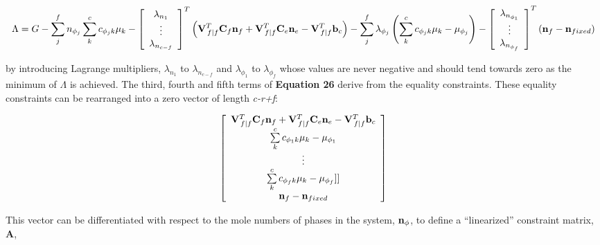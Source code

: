 \documentclass[11pt, titlepage, twoside]{article}
\begin{document}
\begin{MPEquation}[!ht]
\begin{equation}
\Lambda  = G - \sum\limits_j^f {{n_{{\phi _j}}}\sum\limits_k^c {{c_{{\phi _j}k}}{\mu _k}} }  - {\left[ {\begin{array}{*{20}{c}}
{{\lambda _{{n_1}}}}\\
 \vdots \\
{{\lambda _{{n_{c - f}}}}}
\end{array}} \right]^T}\left( {{\bf{V}}_{\left. f \right|f}^T{{\bf{C}}_f}{{\bf{n}}_f} + {\bf{V}}_{\left. f \right|f}^T{{\bf{C}}_e}{{\bf{n}}_e} - {\bf{V}}_{\left. f \right|f}^T{{\bf{b}}_c}} \right) - \sum\limits_j^f {{\lambda _{{\phi _j}}}\left( {\sum\limits_k^c {{c_{{\phi _j}k}}{\mu _k}}  - {\mu _{{\phi _j}}}} \right)} - {\left[ {\begin{array}{*{20}{c}}
{{\lambda _{{n_{{\phi _1}}}}}}\\
 \vdots \\
{{\lambda _{{n_{{\phi _f}}}}}}
\end{array}} \right]^T}\left( {{{\bf{n}}_f} - {{\bf{n}}_{fixed}}} \right)
\end{equation}
\label{MPEquationElement:CC4A876E-C613-4F91-D9DA-BC1B1C7EFC94}
\end{MPEquation}
by introducing Lagrange multipliers, ${{\lambda _{{n_1}}}}$ to ${{\lambda _{{n_{c - f}}}}}$ and ${{\lambda _{{\phi _1}}}}$ to ${{\lambda _{{\phi _f}}}}$ whose values are never negative and should tend towards zero as the minimum of $\Lambda$ is achieved. The third, fourth and fifth terms of \textbf{Equation 26} derive from the equality constraints. These equality constraints can be rearranged into a zero vector of length \emph{c-r+f}:


\begin{MPEquation}[!ht]
\begin{equation}
\left[ {\begin{array}{*{20}{c}}
{{\bf{V}}_{\left. f \right|f}^T{{\bf{C}}_f}{{\bf{n}}_f} + {\bf{V}}_{\left. f \right|f}^T{{\bf{C}}_e}{{\bf{n}}_e} - {\bf{V}}_{\left. f \right|f}^T{{\bf{b}}_c}}\\
{\sum\limits_k^c {{c_{{\phi _1}k}}{\mu _k}}  - {\mu _{{\phi _1}}}}\\
 \vdots \\
{\sum\limits_k^c {{c_{{\phi _f}k}}{\mu _k}}  - {\mu _{{\phi _f}}}}]]\\
{{{\bf{n}}_f} - {{\bf{n}}_{fixed}}}
\end{array}} \right]
\end{equation}
\label{MPEquationElement:BB5977AF-7869-456F-CF04-5074710F8899}
\end{MPEquation}
This vector can be differentiated with respect to the mole numbers of phases in the system, ${{\bf{n}}_\phi }$, to define a ``linearized'' constraint matrix, \textbf{A},
\end{document}
